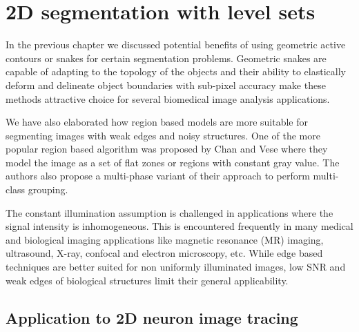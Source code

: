 \chapter{2D segmentation with level sets} %
\label{L2S_Ch} %


In the previous chapter we discussed potential benefits of using geometric active contours or snakes for certain segmentation problems. Geometric snakes are capable of adapting to the topology of the objects and  their ability to elastically deform and delineate object boundaries with sub-pixel accuracy make these methods attractive choice for several biomedical image analysis applications. 

We have also elaborated how region based models are more suitable for segmenting images with weak edges and noisy structures. One of the more popular region based algorithm was proposed by Chan and Vese\cite{chan_vese} where they model the image as a set of flat zones or regions with constant gray value. The authors also propose a multi-phase variant \cite{vese_multiphase} of their approach to perform multi-class grouping. 

The constant illumination assumption is challenged in applications where the signal intensity is inhomogeneous. This is encountered frequently in many medical and biological imaging applications like magnetic resonance (MR) imaging, ultrasound, X-ray, confocal and electron microscopy, etc. While edge based techniques are better suited for non uniformly illuminated images, low SNR and weak edges of biological structures limit their general applicability.

\section{Application to 2D neuron image tracing}

